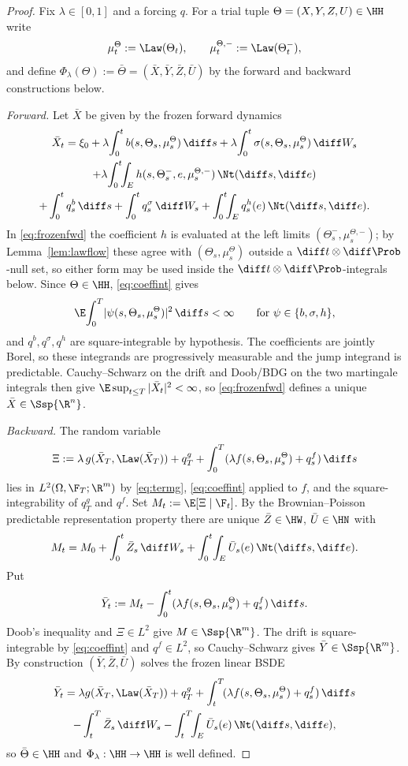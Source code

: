 \begin{proof}
Fix $\lambda\in[0,1]$ and a forcing $q$. For a trial tuple $\Theta=(X,Y,Z,U)\in\HH$ write
\[
\mu^\Theta_t:=\Law(\Theta_t),\qquad\mu^{\Theta,-}_t:=\Law(\Theta_t^-),
\]
and define $\Phi_\lambda(\Theta):=\bar\Theta=(\bar X,\bar Y,\bar Z,\bar U)$ by the forward and
backward constructions below.

\emph{Forward.} Let $\bar X$ be given by the frozen forward dynamics
\begin{multline}\label{eq:frozenfwd}
\bar X_t=\xi_0+\lambda\!\int_0^t b(s,\Theta_s,\mu^\Theta_s)\,\diff s
+\lambda\!\int_0^t\sigma(s,\Theta_s,\mu^\Theta_s)\,\diff W_s\\
+\lambda\!\int_0^t\!\!\int_E h(s,\Theta_s^-,e,\mu^{\Theta,-}_s)\,\Nt(\diff s,\diff e)\\
+\int_0^t q^b_s\,\diff s+\int_0^t q^\sigma_s\,\diff W_s+\int_0^t\!\!\int_E q^h_s(e)\,\Nt(\diff s,\diff e).
\end{multline}
In \eqref{eq:frozenfwd} the coefficient $h$ is evaluated at the left limits
$(\Theta^-_s,\mu^{\Theta,-}_s)$; by Lemma~\ref{lem:lawflow} these agree with
$(\Theta_s,\mu^\Theta_s)$ outside a $\diff t\otimes\diff\Prob$-null set, so either form may be
used inside the $\diff t\otimes\diff\Prob$-integrals below.
Since $\Theta\in\HH$, \eqref{eq:coeffint} gives
\[
\E\!\int_0^T\!|\psi(s,\Theta_s,\mu^\Theta_s)|^2\,\diff s<\infty
\qquad\text{for }\psi\in\{b,\sigma,h\},
\]
and $q^b,q^\sigma,q^h$ are square-integrable by hypothesis. The coefficients are jointly Borel,
so these integrands are progressively measurable and the jump integrand is predictable.
Cauchy--Schwarz on the drift and Doob/BDG on the two martingale integrals then give
$\E\sup_{t\le T}|\bar X_t|^2<\infty$, so \eqref{eq:frozenfwd} defines a unique
$\bar X\in\Ssp{\R^n}$.

\emph{Backward.} The random variable
\[
\Xi:=\lambda\,g(\bar X_T,\Law(\bar X_T))+q^g_T+\int_0^T(\lambda f(s,\Theta_s,\mu^\Theta_s)+q^f_s)\,\diff s
\]
lies in $L^2(\Omega,\F_T;\R^m)$ by \eqref{eq:termg}, \eqref{eq:coeffint} applied to $f$, and the
square-integrability of $q^g_T$ and $q^f$. Set $M_t:=\E[\Xi\mid\F_t]$. By the Brownian--Poisson
predictable representation property there are unique
$\bar Z\in\HW$, $\bar U\in\HN$ with
\[
M_t=M_0+\int_0^t\bar Z_s\,\diff W_s+\int_0^t\!\int_E\bar U_s(e)\,\Nt(\diff s,\diff e).
\]
Put
\[
\bar Y_t:=M_t-\int_0^t(\lambda f(s,\Theta_s,\mu^\Theta_s)+q^f_s)\,\diff s .
\]
Doob's inequality and $\Xi\in L^2$ give $M\in\Ssp{\R^m}$. The drift is square-integrable by
\eqref{eq:coeffint} and $q^f\in L^2$, so Cauchy--Schwarz gives $\bar Y\in\Ssp{\R^m}$. By construction
$(\bar Y,\bar Z,\bar U)$ solves the frozen linear BSDE
\begin{multline}\label{eq:frozenbwd}
\bar Y_t=\lambda g(\bar X_T,\Law(\bar X_T))+q^g_T
+\int_t^T\!(\lambda f(s,\Theta_s,\mu^\Theta_s)+q^f_s)\,\diff s\\
-\int_t^T\bar Z_s\,\diff W_s-\int_t^T\!\!\int_E\bar U_s(e)\,\Nt(\diff s,\diff e),
\end{multline}
so $\bar\Theta\in\HH$ and $\Phi_\lambda:\HH\to\HH$ is well defined.


\end{proof}
